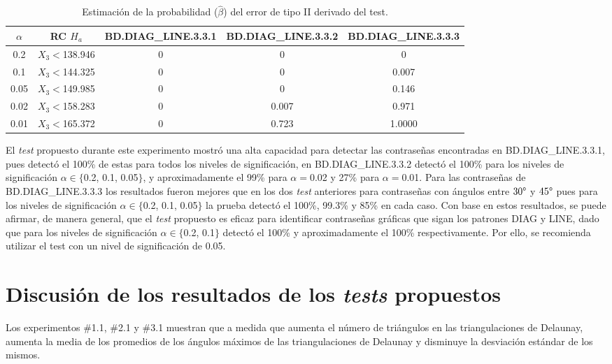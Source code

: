 \documentclass[12pt]{report}
\begin{document}
\begin{table}[h!]
	\centering
	\begin{tabular}{|c|c|ccc|}
		\hline
		$\alpha$&RC $H_a$ &BD.DIAG\_LINE.3.3.1 & BD.DIAG\_LINE.3.3.2 & BD.DIAG\_LINE.3.3.3  \\
		\hline
		0.2 & $X_3<$138.946  &0     & 0          & 0     \\
		0.1 & $X_3<$144.325 &0     & 0          & 0.007     \\
		0.05 &$X_3<$149.985 &0     & 0   		& 0.146     \\
		0.02 &$X_3<$158.283 &0     & 0.007   & 0.971     \\
		0.01 &$X_3<$165.372 &0     & 0.723    & 1.0000     \\
		\hline
	\end{tabular}
	\caption{Estimación de la probabilidad ($\hat{\beta}$) del error de tipo II derivado del test.}
	\label{tab3:error2-prob1}
\end{table}
El \textit{test} propuesto durante este experimento mostró una alta capacidad para detectar las contraseñas encontradas en BD.DIAG\_LINE.3.3.1, pues detectó el 100\% de estas para todos los niveles de significación, en BD.DIAG\_LINE.3.3.2 detectó el 100\% para los niveles de significación $\alpha \in \{$0.2, 0.1, 0.05$\}$, y aproximadamente el 99\% para $\alpha=$0.02 y 27\% para $\alpha=$0.01. Para las contraseñas de BD.DIAG\_LINE.3.3.3 los resultados fueron mejores que en los dos \textit{test} anteriores para contraseñas con ángulos entre $30\degree$ y $45\degree$  pues para los niveles de significación $\alpha \in \{$0.2, 0.1, 0.05$\}$ la prueba detectó el 100\%, 99.3\% y 85\% en cada caso. Con base en estos resultados, se puede afirmar, de manera general, que el \textit{test} propuesto es eficaz para identificar contraseñas gráficas que sigan los patrones DIAG y LINE, dado que para los niveles de significación  $\alpha \in \{$0.2, 0.1$\}$ detectó el 100\% y aproximadamente el 100\% respectivamente.  Por ello, se recomienda utilizar el test con un nivel de significación de 0.05.



\section{Discusión de los resultados de los \textit{tests} propuestos}
Los experimentos \#1.1, \#2.1 y \#3.1 muestran que a medida que aumenta el número de triángulos en las triangulaciones de Delaunay, aumenta la media de los promedios de los ángulos máximos de las triangulaciones de Delaunay y disminuye la desviación estándar de los mismos. 
\end{document}
